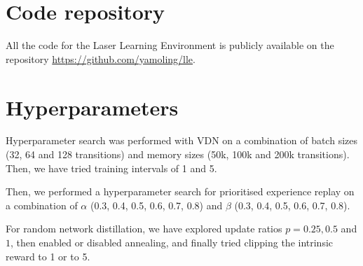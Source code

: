 \section{Code repository}
All the code for the Laser Learning Environment is publicly available on the repository \url{https://github.com/yamoling/lle}.



\section{Hyperparameters}
\label{apx:hyperparameters}
Hyperparameter search was performed with VDN on a combination of batch sizes (32, 64 and 128 transitions) and memory sizes (50k, 100k and 200k transitions). Then, we have tried training intervals of 1 and 5.

Then, we performed a hyperparameter search for prioritised experience replay on a combination of $\alpha$ (0.3, 0.4, 0.5, 0.6, 0.7, 0.8) and $\beta$ (0.3, 0.4, 0.5, 0.6, 0.7, 0.8).

For random network distillation, we have explored update ratios $p = 0.25, 0.5$ and $1$, then enabled or disabled annealing, and finally tried clipping the intrinsic reward to 1 or to 5.


